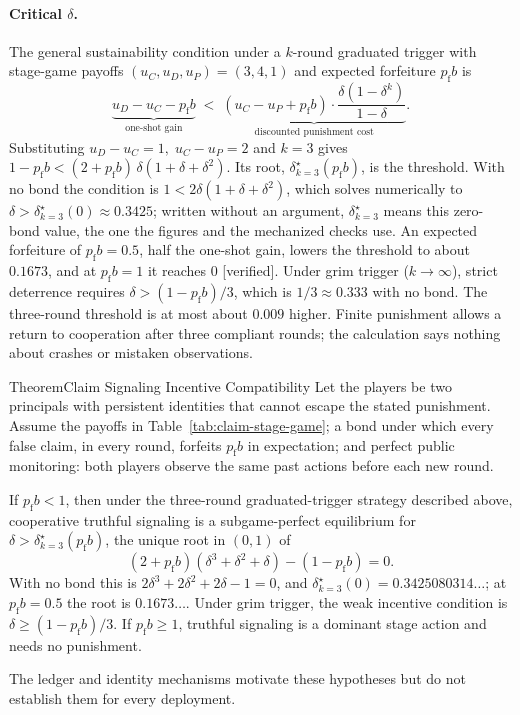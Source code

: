 \documentclass[11pt,a4paper]{article}
\theoremstyle{definition}
\theoremstyle{remark}
\begin{document}
\paragraph{Critical $\delta$.}
The general sustainability condition under a $k$-round graduated trigger with stage-game payoffs $(u_C, u_D, u_P) = (3, 4, 1)$ and expected forfeiture $p_{\mathrm f}b$ is
\[
\underbrace{u_D - u_C - p_{\mathrm f}b}_{\text{one-shot gain}} \;<\; \underbrace{(u_C - u_P + p_{\mathrm f}b) \cdot \frac{\delta(1 - \delta^k)}{1 - \delta}}_{\text{discounted punishment cost}}.
\]
Substituting $u_D - u_C = 1,\; u_C - u_P = 2$ and $k = 3$ gives $1 - p_{\mathrm f}b < (2 + p_{\mathrm f}b)\,\delta(1 + \delta + \delta^2)$. Its root, $\delta^\star_{k=3}(p_{\mathrm f}b)$, is the threshold. With no bond the condition is $1 < 2\delta(1 + \delta + \delta^2)$, which solves numerically to $\delta > \delta^\star_{k=3}(0) \approx 0.3425$; written without an argument, $\delta^\star_{k=3}$ means this zero-bond value, the one the figures and the mechanized checks use. An expected forfeiture of $p_{\mathrm f}b = 0.5$, half the one-shot gain, lowers the threshold to about $0.1673$, and at $p_{\mathrm f}b = 1$ it reaches $0$ [verified]. Under grim trigger ($k \to \infty$), strict deterrence requires $\delta > (1 - p_{\mathrm f}b)/3$, which is $1/3 \approx 0.333$ with no bond. The three-round threshold is at most about $0.009$ higher. Finite punishment allows a return to cooperation after three compliant rounds; the calculation says nothing about crashes or mistaken observations.

\begin{pdclaim}{Theorem}{Claim Signaling Incentive Compatibility}
\setlength{\parskip}{4pt plus 1pt}
\label{prop:claim-signaling-ic}
Let the players be two principals with persistent identities that cannot escape the stated punishment. Assume the payoffs in Table~\ref{tab:claim-stage-game}; a bond under which every false claim, in every round, forfeits $p_{\mathrm f}b$ in expectation; and perfect public monitoring: both players observe the same past actions before each new round.

If $p_{\mathrm f}b<1$, then under the three-round graduated-trigger strategy described above, cooperative truthful signaling is a subgame-perfect equilibrium for $\delta>\delta^\star_{k=3}(p_{\mathrm f}b)$, the unique root in $(0,1)$ of
\[
(2+p_{\mathrm f}b)(\delta^3+\delta^2+\delta)-(1-p_{\mathrm f}b)=0.
\]
With no bond this is $2\delta^3+2\delta^2+2\delta-1=0$, and $\delta^\star_{k=3}(0)=0.3425080314\ldots$; at $p_{\mathrm f}b=0.5$ the root is $0.1673\ldots$. Under grim trigger, the weak incentive condition is $\delta\ge(1-p_{\mathrm f}b)/3$. If $p_{\mathrm f}b\ge1$, truthful signaling is a dominant stage action and needs no punishment.

The ledger and identity mechanisms motivate these hypotheses but do not establish them for every deployment.
\end{pdclaim}
\end{document}
